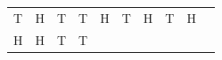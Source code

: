 {{\begin{center}
\begin{tabular}[t]{|l|l|l|l|l|l|l|l|l|l|}
        T &
        H &
        T &
        T &
        H &
        T &
        H &
        T &
        H%
     \tabularnewline\cline{1-1}\cline{2-2}\cline{3-3}\cline{4-4}\cline{5-5}\cline{6-6}\cline{7-7}\cline{8-8}\cline{9-9}\cline{10-10}
        H &
        H &
        T &
        T &

\end{tabular}
\end{center}}}
